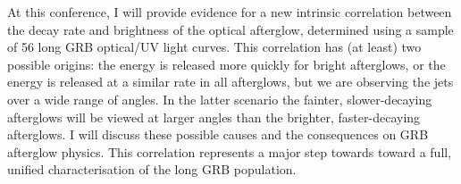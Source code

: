 


\bigskip



\bigskip

\noindent At this conference, I will provide evidence for a new intrinsic correlation between the decay rate and brightness of the optical afterglow, determined using a sample of 56 long GRB optical/UV light curves. This correlation has (at least) two possible origins: the energy is released more quickly for bright afterglows, or the energy is released at a similar rate in all afterglows, but we are observing the jets over a wide range of angles. In the latter scenario the fainter, slower-decaying afterglows will be viewed at larger angles than the brighter, faster-decaying afterglows. I will discuss these possible causes and the consequences on GRB afterglow physics. This correlation represents a major step towards toward a full, unified characterisation of the long GRB population.
